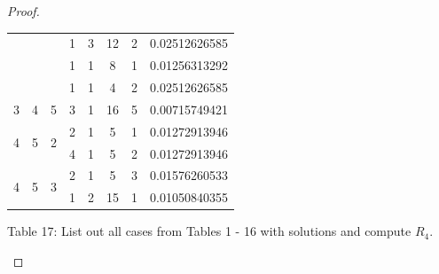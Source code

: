 \documentclass[12pt]{article}
\begin{document}
\begin{proof}
\begin{center}
\begin{tabular}{|c|c|c|c|c|c|c|c|}
 & & & 1 & 3 & 12 & 2 & 0.02512626585 \\
 & & & 1 & 1 & 8 & 1 & 0.01256313292 \\
 & & & 1 & 1 & 4 & 2 & 0.02512626585 \\
\hline
3 & 4 & 5 & 3 & 1 & 16 & 5 & 0.00715749421 \\
\hline
\multirow{2}{*}{4} & \multirow{2}{*}{5} & \multirow{2}{*}{2} & 2 & 1 & 5 & 1 & 0.01272913946 \\
 & & & 4 & 1 & 5 & 2 & 0.01272913946 \\
\hline
\multirow{2}{*}{4} & \multirow{2}{*}{5} & \multirow{2}{*}{3} & 2 & 1 & 5 & 3 & 0.01576260533 \\
 & & & 1 & 2 & 15 & 1 & 0.01050840355 \\
\hline
\end{tabular}
\newline \small{Table 17: List out all cases from Tables 1 - 16 with solutions and compute $R_4$.}
\end{center}


\bigskip


\end{proof}
\end{document}
